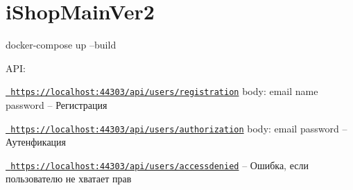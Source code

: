 \chapter{i\+Shop\+Main\+Ver2}
\hypertarget{md__d_1_2project_2for_c_sharp_2i_shop_main_ver2_2_r_e_a_d_m_e}{}\label{md__d_1_2project_2for_c_sharp_2i_shop_main_ver2_2_r_e_a_d_m_e}
\label{md__d_1_2project_2for_c_sharp_2i_shop_main_ver2_2_r_e_a_d_m_e_autotoc_md0}%
%
 docker-\/compose up --build

API\+:

\href{https://localhost:44303/api/users/registration}{\texttt{ https\+://localhost\+:44303/api/users/registration}} body\+: email name password -- Регистрация

\href{https://localhost:44303/api/users/authorization}{\texttt{ https\+://localhost\+:44303/api/users/authorization}} body\+: email password -- Аутенфикация

\href{https://localhost:44303/api/users/accessdenied}{\texttt{ https\+://localhost\+:44303/api/users/accessdenied}} -- Ошибка, если пользователю не хватает прав 